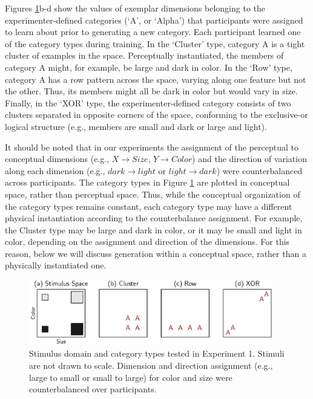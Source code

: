 \documentclass[pdflatex,sn-apa]{sn-jnl}%
\theoremstyle{thmstyleone}%
\theoremstyle{thmstyletwo}%
\theoremstyle{thmstylethree}%
\begin{document}
Figures \ref{fig:e1-conditions}b-d show the values of exemplar dimensions
belonging to the experimenter-defined categories (`A', or `Alpha') that
participants were assigned to learn about prior to generating a new category.
Each participant learned one of the category types during training. In the
`Cluster' type, category A is a tight cluster of examples in the space.
Perceptually instantiated, the members of category A might, for example, be
large and dark in color. In the `Row' type, category A has a row pattern across
the space, varying along one feature but not the other. Thus, its members might
all be dark in color but would vary in size. Finally, in the `XOR' type, the
experimenter-defined category consists of two clusters separated in opposite
corners of the space, conforming to the exclusive-or logical structure (e.g.,
members are small and dark or large and light).

It should be noted that in our experiments the assignment of the perceptual
to conceptual dimensions (e.g., $X \rightarrow Size$, $Y \rightarrow Color$) and the direction of variation along each dimension (e.g., $dark
\rightarrow light$ or $light \rightarrow dark$) were counterbalanced across
participants. The category types in Figure \ref{fig:e1-conditions} are plotted
in conceptual space, rather than perceptual space. Thus, while the
conceptual organization of the category types remains constant, each category
type may have a different physical instantiation according to the counterbalance
assignment. For example, the Cluster type may be large and dark in color, or it
may be small and light in color, depending on the assignment and direction of
the dimensions. For this reason, below we will discuss generation within a
conceptual space, rather than a physically instantiated one.

\begin{figure}
    \begin{center} \includegraphics[width=0.95\textwidth]{figs/e1-conditions.eps}
    \caption{Stimulus domain and category types tested in Experiment 1. Stimuli
are not drawn to scale. Dimension and direction assignment (e.g., large to small or small to large) for color and size were counterbalanced over participants.}
    \label{fig:e1-conditions}
    \end{center}
\end{figure}
\end{document}
